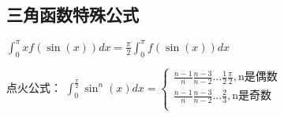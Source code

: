 \subsection{三角函数特殊公式}
$\int ^\pi_0 x f(\sin(x))dx = \frac{\pi}{2}\int ^\pi_0 f(\sin(x))dx$

点火公式：
$
\int ^{\frac{\pi}{2}}_{0} \sin^n(x) dx= 
\left \{
\begin{aligned}
\frac{n-1}{n} \frac{n-3}{n-2}...\frac{1}{2} \frac{\pi}{2},\text{n是偶数}\\
\frac{n-1}{n} \frac{n-3}{n-2}...\frac{2}{3},\text{n是奇数}\\
\end{aligned}
\right.
$
